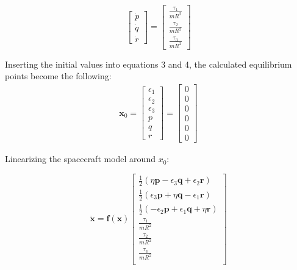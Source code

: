 \begin{equation}
    \begin{bmatrix}
    \dot{p} \\ \dot{q} \\ \dot{r}
    \end{bmatrix}
    =
    \begin{bmatrix}
    \frac{\tau_1}{mR^2} \\ \frac{\tau_2}{mR^2} \\ \frac{\tau_3}{mR^2} 
    \end{bmatrix}
\end{equation}




Inserting the initial values into equations 3 and 4, the calculated equilibrium points become the following: 
\begin{align*}
    \mathbf{x}_0 =
    \begin{bmatrix}
        \epsilon_1 \\ \epsilon_2 \\ \epsilon_3 \\p \\ q \\ r 
    \end{bmatrix}
    = 
    \begin{bmatrix}
        0 \\ 0 \\ 0 \\ 0 \\ 0 \\ 0
    \end{bmatrix}
\end{align*}

Linearizing the spacecraft model around $x_0$: 

\begin{equation}
    \dot{\mathbf{x}} = \mathbf{f(x)}
    \begin{bmatrix}
        \frac{1}{2}(\eta \mathbf{p} -\epsilon_3 \mathbf{q} + \epsilon_2 \mathbf{r}) \\
        \frac{1}{2}(\epsilon_3 \mathbf{p} + \eta \mathbf{q}  - \epsilon_1 \mathbf{r})\\
        \frac{1}{2}(-\epsilon_2 \mathbf{p} +\epsilon_1 \mathbf{q} + \eta \mathbf{r}) \\
        \frac{\tau_1}{mR^2}\\
        \frac{\tau_2}{mR^2}\\
        \frac{\tau_3}{mR^2}\\
    \end{bmatrix} 
\end{equation}


